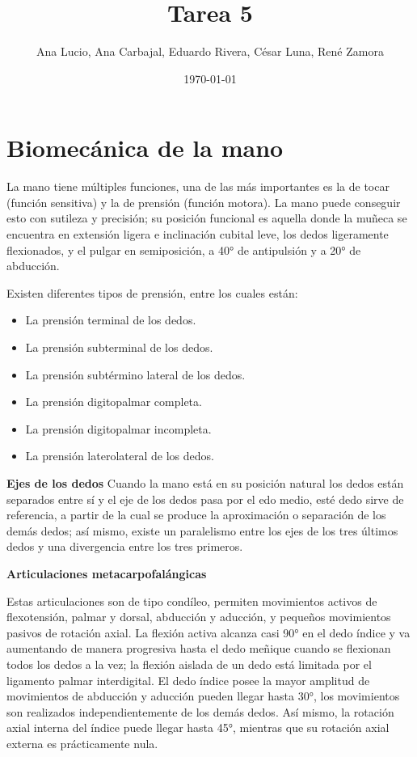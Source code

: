\documentclass{article}
\author{Ana Lucio,
Ana Carbajal,
Eduardo Rivera,
César Luna,
René Zamora} %
\title{Tarea 5} %
\date{\today}
\begin{document}

\maketitle %


\section{Biomecánica de la mano}
La mano tiene múltiples funciones, una de las más importantes es la de tocar (función sensitiva) y la de prensión (función motora). La mano puede conseguir esto con sutileza y precisión; su posición funcional es aquella donde la muñeca se encuentra en extensión ligera e inclinación cubital leve, los dedos ligeramente flexionados, y el pulgar en semiposición, a 40° de antipulsión y a 20° de abducción.

Existen diferentes tipos de prensión, entre los cuales están:

\begin{itemize}
\item La prensión terminal de los dedos.
\item La prensión subterminal de los dedos.
\item La prensión subtérmino lateral de los dedos.
\item La prensión digitopalmar completa.
\item La prensión digitopalmar incompleta.
\item La prensión laterolateral de los dedos.
\end{itemize}

\textbf{Ejes de los dedos}
Cuando la mano está en su posición natural los dedos están separados entre sí y el eje de los dedos pasa por el edo medio, esté dedo sirve de referencia, a partir de la cual se produce la aproximación o separación de los demás dedos; así mismo, existe un paralelismo entre los ejes de los tres últimos dedos y una divergencia entre los tres primeros.

\textbf{Articulaciones metacarpofalángicas}

Estas articulaciones son de tipo condíleo, permiten movimientos activos de flexotensión, palmar y dorsal, abducción y aducción, y pequeños movimientos pasivos de rotación axial.
La flexión activa alcanza casi 90° en el dedo índice y va aumentando de manera progresiva hasta el dedo meñique cuando se flexionan todos los dedos a la vez; la flexión aislada de un dedo está limitada por el ligamento palmar interdigital.
El dedo índice posee la mayor amplitud de movimientos de abducción y aducción pueden llegar hasta 30°, los movimientos son realizados independientemente de los demás dedos. Así mismo, la rotación axial interna del índice puede llegar hasta 45°, mientras que su rotación axial externa es prácticamente nula.
\end{document}
